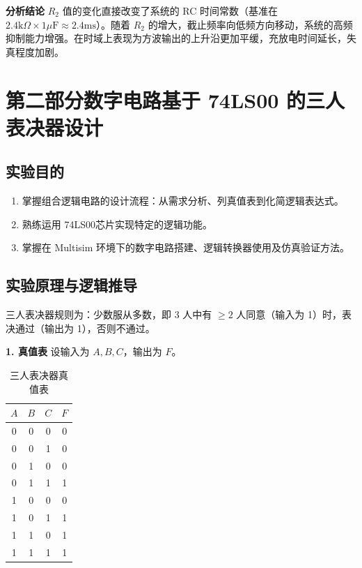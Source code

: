 \documentclass[12pt, a4paper]{article}
\begin{document}
\textbf{分析结论} $R_2$ 值的变化直接改变了系统的 RC 时间常数（基准在 $2.4\text{k}\Omega \times 1\mu\text{F} \approx 2.4\text{ms}$）。随着 $R_2$ 的增大，截止频率向低频方向移动，系统的高频抑制能力增强。在时域上表现为方波输出的上升沿更加平缓，充放电时间延长，失真程度加剧。

\newpage
\section{第二部分数字电路基于 74LS00 的三人表决器设计}

\subsection{实验目的}
\begin{enumerate}
    \item 掌握组合逻辑电路的设计流程：从需求分析、列真值表到化简逻辑表达式。
    \item 熟练运用 74LS00芯片实现特定的逻辑功能。
    \item 掌握在 Multisim 环境下的数字电路搭建、逻辑转换器使用及仿真验证方法。
\end{enumerate}

\subsection{实验原理与逻辑推导}
三人表决器规则为：少数服从多数，即 3 人中有 $\geq 2$ 人同意（输入为 1）时，表决通过（输出为 1），否则不通过。

\textbf{1. 真值表} 设输入为 $A, B, C$，输出为 $F$。
\begin{table}[H]
    \centering
    \caption{三人表决器真值表}
    \begin{tabular}{ccc|c}
        \toprule
        $A$ & $B$ & $C$ & $F$ \\
        \midrule
        0 & 0 & 0 & 0 \\
        0 & 0 & 1 & 0 \\
        0 & 1 & 0 & 0 \\
        0 & 1 & 1 & 1 \\
        1 & 0 & 0 & 0 \\
        1 & 0 & 1 & 1 \\
        1 & 1 & 0 & 1 \\
        1 & 1 & 1 & 1 \\
        \bottomrule
    \end{tabular}
\end{table}
\end{document}
